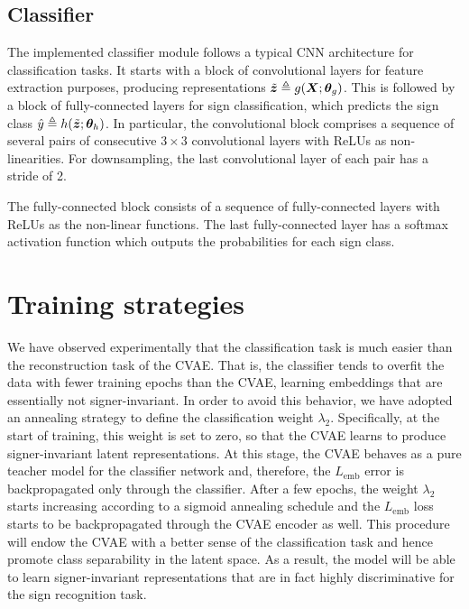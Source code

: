 \subsection{Classifier}
The implemented classifier module follows a typical CNN architecture for classification tasks. It starts with a block of convolutional layers for feature extraction purposes, producing representations $\tilde{{\bm{z}}} \triangleq g({\bm{X}};{\bm{\theta}}_g)$. This is followed by a block of fully-connected layers for sign classification, which predicts the sign class $\hat{y} \triangleq h(\tilde{{\bm{z}}};{\bm{\theta}}_h)$. In particular, the convolutional block comprises a sequence of several pairs of consecutive $3 \times 3$ convolutional layers with ReLUs as non-linearities. For downsampling, the last convolutional layer of each pair has a stride of 2.

The fully-connected block consists of a sequence of fully-connected layers with ReLUs as the non-linear functions. The last fully-connected layer has a softmax activation function which outputs the probabilities for each sign class.

\section{Training strategies}
\label{sec:desire_training_strat}

We have observed experimentally that the classification task is much easier than the reconstruction task of the CVAE. That is, the classifier tends to overfit the data with fewer training epochs than the CVAE, learning embeddings that are essentially not signer-invariant. In order to avoid this behavior, we have adopted an annealing strategy to define the classification weight $\lambda_2$. Specifically, at the start of training, this weight is set to zero, so that the CVAE learns to produce signer-invariant latent representations. At this stage, the CVAE behaves as a pure teacher model for the classifier network and, therefore, the $L_\text{emb}$ error is backpropagated only through the classifier. After a few epochs, the weight $\lambda_2$ starts increasing according to a sigmoid annealing schedule and the $L_\text{emb}$ loss starts to be backpropagated through the CVAE encoder as well. This procedure will endow the CVAE with a better sense of the classification task and hence promote class separability in the latent space. As a result, the model will be able to learn signer-invariant representations that are in fact highly discriminative for the sign recognition task.

